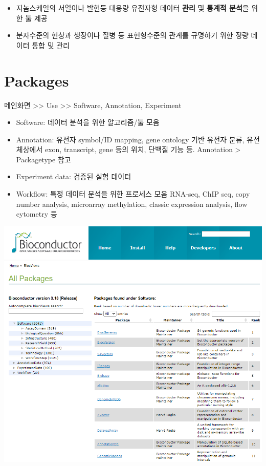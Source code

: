 \documentclass[
]{book}
\providecommand{\tightlist}{%
  \setlength{\itemsep}{0pt}\setlength{\parskip}{0pt}}
\begin{document}
\begin{itemize}
\tightlist
\item
  지놈스케일의 서열이나 발현등 대용량 유전자형 데이터 \textbf{관리} 및 \textbf{통계적 분석}을 위한 툴 제공
\item
  분자수준의 현상과 생장이나 질병 등 표현형수준의 관계를 규명하기 위한 정량 데이터 통합 및 관리
\end{itemize}

\hypertarget{packages}{%
\section{Packages}\label{packages}}

메인화면 \textgreater\textgreater{} Use \textgreater\textgreater{} Software, Annotation, Experiment

\begin{itemize}
\tightlist
\item
  Software: 데이터 분석을 위한 알고리즘/툴 모음
\item
  Annotation: 유전자 symbol/ID mapping, gene ontology 기반 유전자 분류, 유전체상에서 exon, transcript, gene 등의 위치, 단백질 기능 등. Annotation \textgreater{} Packagetype 참고
\item
  Experiment data: 검증된 실험 데이터
\item
  Workflow: 특정 데이터 분석을 위한 프로세스 모음 RNA-seq, ChIP seq, copy number analysis, microarray methylation, classic expression analysis, flow cytometry 등
\end{itemize}

\includegraphics[width=6.25in,height=\textheight]{images/bioconductor_list.PNG}
\end{document}
